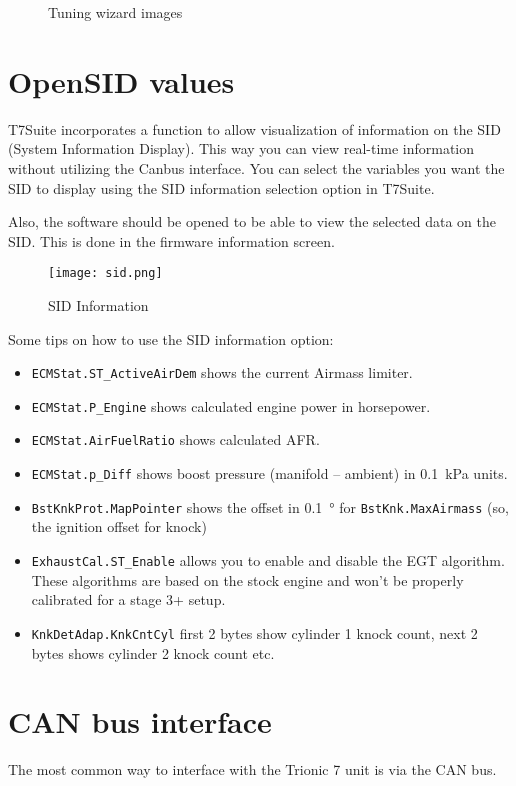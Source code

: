 \documentclass[11pt,a4paper]{book}
\newcommand{\Mfig}[1]{%
\begin{figure}
    \centering
    \missingfigure{#1}
    \caption{#1}
\end{figure}}
\begin{document}
\Mfig{Tuning wizard images}

\chapter{OpenSID values}
T7Suite incorporates a function to allow visualization of information on the SID
(System Information Display). This way you can view real-time information
without utilizing the Canbus interface. You can select the variables you want
the SID to display using the SID information selection option in T7Suite.

Also, the software should be opened to be able to view the selected data on the
SID. This is done in the firmware information screen.
\begin{figure}
    \centering
    \texttt{[image: sid.png]}
    \caption{SID Information}
    \label{fig:}
\end{figure}

Some tips on how to use the SID information option:
\begin{itemize}
    \item
        \texttt{ECMStat.ST\_ActiveAirDem} shows the current Airmass limiter.
    \item
        \texttt{ECMStat.P\_Engine} shows calculated engine power in horsepower.
    \item
        \texttt{ECMStat.AirFuelRatio} shows calculated AFR.
    \item
        \texttt{ECMStat.p\_Diff} shows boost pressure (manifold – ambient) in
        \SI{0.1}{\kilo\pascal} units.
    \item
        \texttt{BstKnkProt.MapPointer} shows the offset in \SI{0.1}{\degree} for
        \texttt{BstKnk.MaxAirmass} (so, the
        ignition offset for knock)
    \item
        \texttt{ExhaustCal.ST\_Enable} allows you to enable and disable the EGT
        algorithm. These algorithms are based on the stock engine and won’t be
        properly calibrated for a stage 3+ setup.
    \item
        \texttt{KnkDetAdap.KnkCntCyl} first 2 bytes show cylinder 1 knock count,
        next 2 bytes shows cylinder 2 knock count etc.
\end{itemize}

\chapter{CAN bus interface}
The most common way to interface with the Trionic 7 unit is via the CAN
bus.
\end{document}
